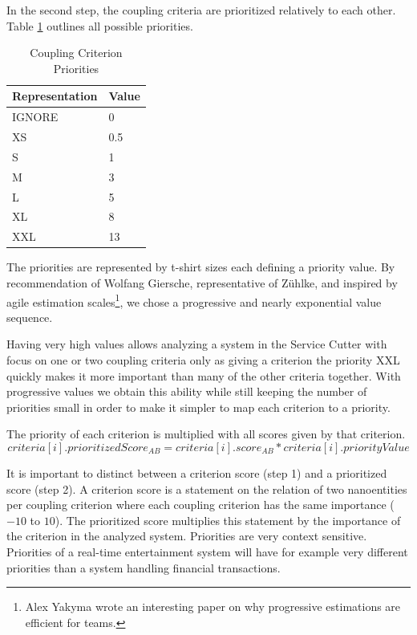 In the second step, the coupling criteria are prioritized relatively to each other. Table \ref{tab:priorities} outlines all possible priorities.

\begin{table}[H]
	\centering
	\caption{Coupling Criterion Priorities}
	\label{tab:priorities}
	\begin{tabular}{|p{70pt}|p{30pt}|}
		\hline	
		Representation & Value  \\
		\hline
		IGNORE & 0  \\
		\hline
		XS & 0.5  \\
		\hline
		S & 1  \\
		\hline
		M & 3  \\
		\hline
		L & 5  \\
		\hline
		XL & 8  \\
		\hline
		XXL & 13  \\
		\hline
	\end{tabular}
\end{table}

The priorities are represented by t-shirt sizes each defining a priority value. By recommendation of Wolfang Giersche, representative of Zühlke, and inspired by agile estimation scales\footnote{Alex Yakyma wrote an interesting paper on why progressive estimations are efficient for teams\cite{estimation}.}, we chose a progressive and nearly exponential value sequence. 

Having very high values allows analyzing a system in the Service Cutter with focus on one or two coupling criteria only as giving a criterion the priority XXL quickly makes it more important than many of the other criteria together. With progressive values we obtain this ability while still keeping the number of priorities small in order to make it simpler to map each criterion to a priority. 

The priority of each criterion is multiplied with all scores given by that criterion. 
\begin{displaymath}
	criteria[i].prioritizedScore_{AB} = criteria[i].score_{AB} * criteria[i].priorityValue
\end{displaymath}

It is important to distinct between a criterion score (step 1) and a prioritized score (step 2). A criterion score is a statement on the relation of two nanoentities per coupling criterion where each coupling criterion has the same importance ($-10$ to $10$). The prioritized score multiplies this statement by the importance of the criterion in the analyzed system. Priorities are very context sensitive. Priorities of a real-time entertainment system will have for example very different priorities than a system handling financial transactions. 


